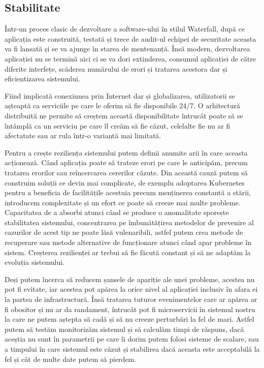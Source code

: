 \subsection{Stabilitate}
Într-un proces clasic de dezvoltare a software-ului în stilul Waterfall, după ce aplicația
este construită, testată și trece de audit-ul echipei de securitate aceasta va fi lansată și
se va ajunge în starea de mentenanță. Însă modern, dezvoltarea aplicației nu se termină
aici ci se va dori extinderea, consumul aplicației de către diferite interfețe, scăderea
numărului de erori și tratarea acestora dar și eficientizarea sistemului.

Fiind implicată conexiunea prin Internet dar și globalizarea, utilizatorii se așteaptă
ca serviciile pe care le oferim să fie disponibile 24/7. O arhitectură distribuită ne
permite să creștem această disponibilitate întrucât poate să se întâmplă ca un serviciu
pe care îl creăm să fie căzut, celelalte fie nu ar fi afectatate sau ar rula într-o variantă
mai limitată.

Pentru a crește reziliența sistemului putem definii anumite arii în care aceasta acționează.
Când aplicația poate să trateze erori pe care le anticipăm, precum tratarea erorilor sau
reîncercarea cererilor căzute. Din această cauză putem să construim soluții ce devin mai complicate,
de exemplu adoptarea Kubernetes pentru a beneficia de facilitățile acestuia precum
menținerea constantă a stării, introducem complexitate și un efort ce poate să creeze mai multe
probleme. Capacitatea de a absorbi atunci când se produce o anomalitate sporește stabilitatea
sistemului, concentrarea pe îmbunătățirea metodelor de prevenire al cazurilor de acest
tip ne poate lăsă vulenaribili, astfel putem crea metode de recuperare sau metode alternative
de funcționare atunci când apar probleme în sistem. Creșterea rezilienței ar trebui să
fie făcută constant și să ne adaptăm la evoluția sistemului.

Deși putem încerca să reducem șansele de apariție ale unei probleme, acestea nu pot fi evitate,
iar acestea pot apărea la orice nivel al aplicației inclusiv în afara ei la partea de infrastructură.
Însă tratarea tuturor evenimentelor care ar apărea ar fi obositor și nu ar da randament,
întrucât pot fi microservicii în sistemul nostru la care ne putem aștepta să cadă și să
nu creeze perturbări la fel de mari. Astfel putem să testăm monitorizăm sistemul și
să calculăm timpi de răspuns, dacă aceștia nu sunt în parametrii pe care îi dorim
putem folosi sisteme de scalare, sau a timpului în care sistemul este căzut și stabilirea
dacă aceasta este acceptabilă la fel și cât de multe date putem să pierdem.


